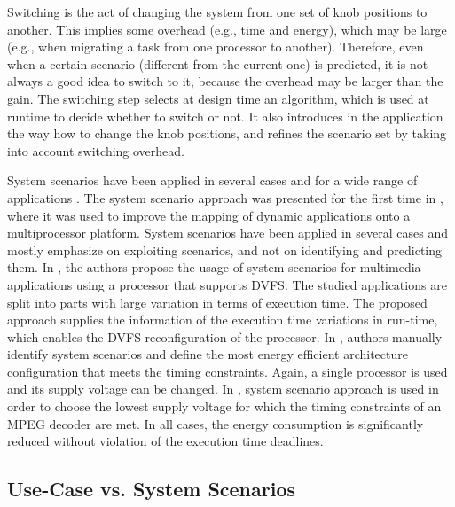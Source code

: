 \begin{enumerate}
Switching is the act of changing the system from one set of knob positions to another. This implies some overhead (e.g., time and energy), which may be large (e.g., when migrating a task from one processor to another). 
Therefore, even when a certain scenario (different from the current one) is predicted, it is not always a good idea to switch to it, because the overhead may be larger than the gain. The switching step selects at design time an algorithm, which is used at runtime to decide whether to switch or not. 
It also introduces in the application the way how to change the knob positions, and refines the scenario set by taking into account switching overhead.

\end{enumerate}

System scenarios have been applied in several cases and for a wide range of applications \cite{tcm}.
The system scenario approach was presented for the first time in \cite{yang2002}, where it was used to improve the mapping of dynamic applications onto a multiprocessor platform.
System scenarios have been applied in several cases and mostly emphasize on exploiting scenarios, and not on identifying and predicting them. 
In \cite{Chu02}, the authors propose the usage of system scenarios for multimedia applications using a processor that supports DVFS. 
The studied applications are split into parts with large variation in terms of execution time. 
The proposed approach supplies the information of the execution time variations in run-time, which enables the DVFS reconfiguration of the processor.
In \cite{sasanka2002}, authors manually identify system scenarios and define the most energy efficient architecture configuration that meets the timing constraints. 
Again, a single processor is used and its supply voltage can be changed. 
In \cite{choi2002}, system scenario approach is used in order to choose the lowest supply voltage for which the timing constraints of an MPEG decoder are met. 
In all cases, the energy consumption is significantly reduced without violation of the execution time deadlines.


\subsection{Use-Case vs. System Scenarios}

